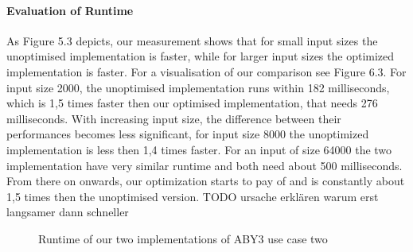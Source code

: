 \paragraph{Evaluation of Runtime}
As Figure 5.3 depicts, our measurement shows that for small input sizes the unoptimised implementation is faster, while for larger input sizes the optimized implementation is faster. For a visualisation of our comparison see Figure 6.3. For input size 2000, the unoptimised implementation runs within 182 milliseconds, which is 1,5 times faster then our optimised implementation, that needs 276 milliseconds. With increasing input size, the difference between their performances becomes less significant, for input size 8000 the unoptimized implementation is less then 1,4 times faster. For an input of size 64000 the two implementation have very similar runtime and both need about 500 milliseconds. From there on onwards, our optimization starts to pay of and is constantly about 1,5 times then the unoptimised version. 
TODO ursache erklären warum erst langsamer dann schneller

\begin{figure}[H]
\caption{Runtime of our two implementations of ABY3  use case two}
\end{figure}
